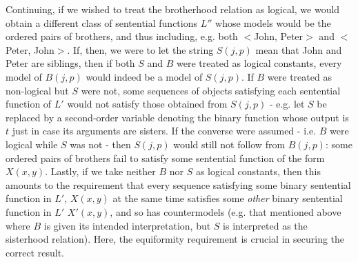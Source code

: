\documentclass[]{article}
\begin{document}
Continuing, if we wished to treat the brotherhood relation as logical, we would obtain a different class of sentential functions $L''$ whose models would be the ordered pairs of brothers, and thus including, e.g. both $<$John, Peter$>$ and $<$Peter, John$>$. If, then, we were to let the string $S(j, p)$ mean that John and Peter are siblings, then if both $S$ and $B$ were treated as logical constants, every model of $B(j, p)$  would indeed be a model of $S(j, p)$. If $B$ were treated as non-logical but $S$ were not, some sequences of objects satisfying each sentential function of $L'$ would not satisfy those obtained from $S(j, p)$ - e.g. let $S$ be replaced by a second-order variable denoting the binary function whose output is $t$ just in case its arguments are sisters. If the converse were assumed - i.e. $B$ were logical while $S$ was not - then $S(j, p)$ would still not follow from $B(j, p)$: some ordered pairs of brothers fail to satisfy some sentential function of the form $X(x, y)$. Lastly, if we take neither $B$ nor $S$ as logical constants, then this amounts to the requirement that every sequence satisfying some binary sentential function in $L'$, $X(x, y)$ at the same time satisfies some \textit{other} binary sentential function in $L'$ $X'(x, y)$, and so has countermodels (e.g. that mentioned above where $B$ is given its intended interpretation, but $S$ is interpreted as the sisterhood relation). Here, the equiformity requirement is crucial in securing the correct result.
\end{document}
